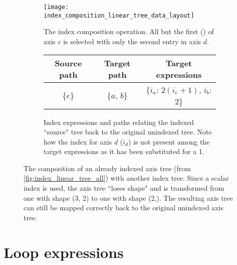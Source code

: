 \documentclass[thesis]{subfiles}
\begin{document}
\begin{figure}[h]
  \centering
  \begin{subfigure}{\textwidth}
    \centering
    \texttt{[image: index\_composition\_linear\_tree\_data\_layout]}
    \caption{
      The index composition operation.
      All but the first () of axis $c$ is selected with only the second entry in axis $d$.
    }
    \label{fig:index_composition_linear_tree_data_layout}
  \end{subfigure}

  \vspace{1em}

  \begin{subfigure}{\textwidth}
    \centering
    \begin{tabular}{|c|c|c|}
      \hline
      \textbf{Source path} & \textbf{Target path} & \textbf{Target expressions} \\
      \hline
      \{$e$\} & \{$a$, $b$\} & \{$i_a$: $2 (i_e+1)$, $i_b$: $2$\} \\
      \hline
    \end{tabular}
    \caption{
      Index expressions and paths relating the indexed ``source" tree back to the original unindexed tree.
      Note how the index for axis $d$ ($i_d$) is not present among the target expressions as it has been substituted for a 1.
    }
    \label{fig:index_composition_linear_tree_exprs}
  \end{subfigure}

  \caption{
    The composition of an already indexed axis tree (from \cref{fig:index_linear_tree_all}) with another index tree.
    Since a scalar index is used, the axis tree ``loses shape" and is transformed from one with shape (3, 2) to one with shape (2,).
    The resulting axis tree can still be mapped correctly back to the original unindexed axis tree.
  }
  \label{fig:index_composition_linear_tree_all}
\end{figure}

\section{Loop expressions}
\end{document}
